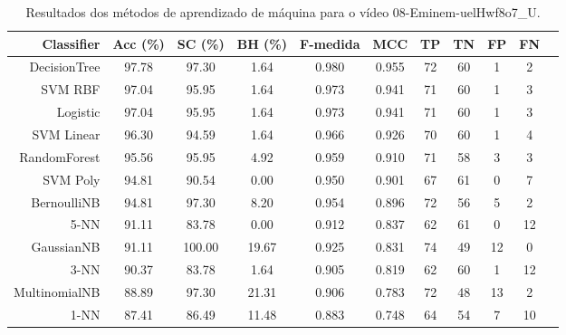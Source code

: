 \begin{table}[!htb]
\centering
\caption{Resultados dos métodos de aprendizado de máquina para o vídeo 08-Eminem-uelHwf8o7_U.}
\label{tab:08-Eminem-uelHwf8o7_U}
\begin{tabular}{r|c|c|c|c|c|c|c|c|c|c}
\hline\hline
Classifier & Acc (\%) & SC (\%) & BH (\%) & F-medida & MCC & TP & TN & FP & FN \\ \hline
DecisionTree & 97.78 & 97.30 & 1.64 & 0.980 & 0.955 & 72 & 60 & 1 & 2 \\ 
SVM RBF & 97.04 & 95.95 & 1.64 & 0.973 & 0.941 & 71 & 60 & 1 & 3 \\ 
Logistic & 97.04 & 95.95 & 1.64 & 0.973 & 0.941 & 71 & 60 & 1 & 3 \\ 
SVM Linear & 96.30 & 94.59 & 1.64 & 0.966 & 0.926 & 70 & 60 & 1 & 4 \\ 
RandomForest & 95.56 & 95.95 & 4.92 & 0.959 & 0.910 & 71 & 58 & 3 & 3 \\ 
SVM Poly & 94.81 & 90.54 & 0.00 & 0.950 & 0.901 & 67 & 61 & 0 & 7 \\ 
BernoulliNB & 94.81 & 97.30 & 8.20 & 0.954 & 0.896 & 72 & 56 & 5 & 2 \\ 
5-NN & 91.11 & 83.78 & 0.00 & 0.912 & 0.837 & 62 & 61 & 0 & 12 \\ 
GaussianNB & 91.11 & 100.00 & 19.67 & 0.925 & 0.831 & 74 & 49 & 12 & 0 \\ 
3-NN & 90.37 & 83.78 & 1.64 & 0.905 & 0.819 & 62 & 60 & 1 & 12 \\ 
MultinomialNB & 88.89 & 97.30 & 21.31 & 0.906 & 0.783 & 72 & 48 & 13 & 2 \\ 
1-NN & 87.41 & 86.49 & 11.48 & 0.883 & 0.748 & 64 & 54 & 7 & 10 \\ 
\hline\hline
\end{tabular}
\end{table}
